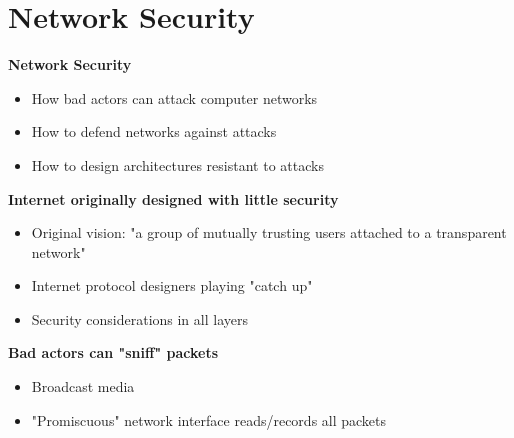 \documentclass{article}[18pt]
\begin{document}
\section{Network Security}
\textbf{Network Security}
\begin{itemize}
	\item How bad actors can attack computer networks
	\item How to defend networks against attacks
	\item How to design architectures resistant to attacks
\end{itemize}
\textbf{Internet originally designed with little security}
\begin{itemize}
	\item Original vision: "a group of mutually trusting users attached to a transparent network"
	\item Internet protocol designers playing "catch up"
	\item Security considerations in all layers
\end{itemize}
\textbf{Bad actors can "sniff" packets}
\begin{itemize}
	\item Broadcast media
	\item "Promiscuous" network interface reads/records all packets
\end{itemize}
\end{document}
